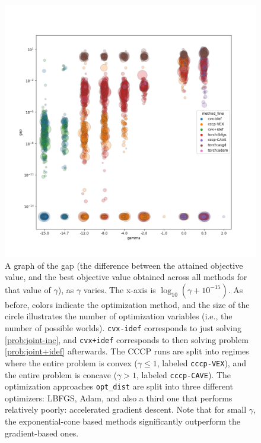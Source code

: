 \begin{subappendices}
\begin{figure}
    \includegraphics[width=\linewidth]{figs/2}
    \caption[
        Plot of the accuracy gap for inference methods and baselines, for various values of $\gamma$.
    ]{
        A graph of the gap (the difference between the attained objective value, and the best objective value obtained across all methods for that value of $\gamma$),
        as $\gamma$ varies. The x-axis is $\log_{10} ( \gamma + 10^{-15})$.
        As before, colors indicate the optimization method, and
        the size of the circle illustrates the number of optimization variables (i.e., the number of possible worlds).
        \texttt{cvx-idef} corresponds to just solving \eqref{prob:joint-inc}, and \texttt{cvx+idef} corresponds to then solving problem \eqref{prob:joint+idef} afterwards.
        The CCCP runs are split into regimes where the entire problem is convex ($\gamma \le 1$, labeled \texttt{cccp-VEX}), and the entire problem is concave ($\gamma > 1$, labeled \texttt{cccp-CAVE}).
        The optimization approaches \texttt{opt\_dist} are split into three different optimizers: LBFGS, Adam, and also a third one that
        performs relatively poorly: accelerated gradient descent.
        Note that for small $\gamma$, the exponential-cone based methods significantly outperform the gradient-based ones.
    }\label{fig:gamma-v-gap-fine}
\end{figure}



\end{subappendices}

